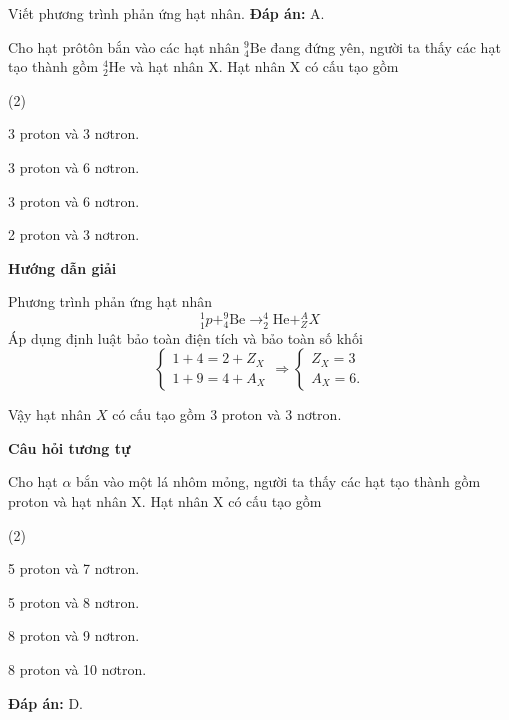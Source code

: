 \begin{dang}{Viết phương trình phản ứng hạt nhân.}
{		\textbf{Đáp án:} A.
	}
	{Cho hạt prôtôn bắn vào các hạt nhân $^9_4\text{Be}$ đang đứng yên, người ta thấy các hạt tạo thành gồm $^4_2\text{He}$ và hạt nhân X. Hạt nhân X có cấu tạo gồm
		\begin{mcq}(2)
			\item 3 proton và 3 nơtron.
			\item 3 proton và 6 nơtron.
			\item 3 proton và 6 nơtron.
			\item 2 proton và 3 nơtron.
		\end{mcq}
	}	{\begin{center}
			\textbf{Hướng dẫn giải}
		\end{center}
		Phương trình phản ứng hạt nhân
		\begin{equation*}
			^1_1 p+^9_4\text{Be}\rightarrow ^4_2\text{He}+^A_Z X
		\end{equation*}
		Áp dụng định luật bảo toàn điện tích và bảo toàn số khối
		\begin{equation*}
			\left\{
			\begin{matrix}
				1+4=2+Z_X\\
				1+9=4+A_X
			\end{matrix}
			\right.
			\Rightarrow
			\left\{
			\begin{matrix}
				Z_X=3\\
				A_X=6.
			\end{matrix}
			\right.
		\end{equation*}
		
		Vậy hạt nhân $X$ có cấu tạo gồm 3 proton và 3 nơtron.
		
		\begin{center}
			\textbf{Câu hỏi tương tự}
		\end{center}
		Cho hạt $ \alpha $ bắn vào một lá nhôm mỏng, người ta thấy các hạt tạo thành gồm proton và hạt nhân X. Hạt nhân X có cấu tạo gồm
		\begin{mcq}(2)
			\item 5 proton và 7 nơtron.
			\item 5 proton và 8 nơtron.
			\item 8 proton và 9 nơtron.
			\item 8 proton và 10 nơtron.
		\end{mcq}
		
		
		\textbf{Đáp án:} D.
	}
\end{dang}

